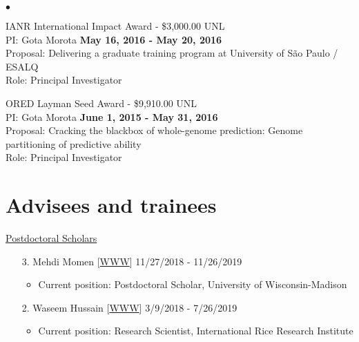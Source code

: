 \documentclass[margin,line,10pt]{res}
\newenvironment{list2}{
  \begin{list}{$\bullet$}{%
      \setlength{\itemsep}{0in}
      \setlength{\parsep}{0in} \setlength{\parskip}{0in}
      \setlength{\topsep}{0in} \setlength{\partopsep}{0in} 
      \setlength{\leftmargin}{0.2in}}}{\end{list}}
\begin{document}
\begin{resume}
\begin{list2}
\vspace{0.5cm}


\item IANR International Impact Award - \$3,000.00  \hfill UNL\\
PI: Gota Morota   \hfill \textbf{May 16, 2016 - May 20, 2016}\\
Proposal: Delivering a graduate training program at University of S{\~a}o Paulo / ESALQ  \\
Role: Principal Investigator \\ 

\vspace{0.5cm}

\item ORED Layman Seed Award - \$9,910.00  \hfill UNL\\
PI: Gota Morota   \hfill \textbf{June 1, 2015 - May 31, 2016}\\
Proposal: Cracking the blackbox of whole-genome prediction: Genome partitioning of predictive ability \\
Role: Principal Investigator \\


\end{list2}



\vspace{0.5cm}
\section{\sc Advisees and trainees}

\begin{flushleft}
\hspace{0.2cm} \underline{Postdoctoral Scholars}
\end{flushleft}
\begin{enumerate}
  
\item [3.] Mehdi Momen [\textcolor{blue}{\href{https://mehdimomen.github.io/}{WWW}}]  \hfill 11/27/2018 - 11/26/2019
  \begin{itemize} 
  \item Current position: Postdoctoral Scholar, University of Wisconsin-Madison 
  \end{itemize}
  
  \vspace{0.3cm}
  
\item [2.] Waseem Hussain  [\textcolor{blue}{\href{https://whussain2.github.io/}{WWW}}]  \hfill 3/9/2018 - 7/26/2019
  \begin{itemize} 
  \item Current position: Research Scientist, International Rice Research Institute
  \end{itemize}
   

\end{enumerate}
\end{resume}
\end{document}
